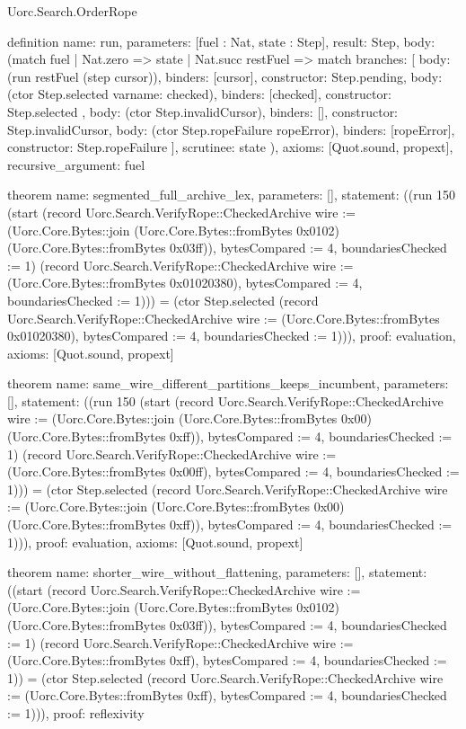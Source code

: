 \begin{lexlean}{Uorc.Search.OrderRope}
\begin{semanticmodule}
definition{
  name: run,
  parameters: [fuel : Nat, state : Step],
  result: Step,
  body: (match fuel
    | Nat.zero => state
    | Nat.succ restFuel => match{
      branches: [
        {body: (run restFuel (step cursor)), binders: [cursor], constructor: Step.pending},
        {
          body: (ctor Step.selected var{name: checked}),
          binders: [checked],
          constructor: Step.selected
        },
        {body: (ctor Step.invalidCursor), binders: [], constructor: Step.invalidCursor},
        {
          body: (ctor Step.ropeFailure ropeError),
          binders: [ropeError],
          constructor: Step.ropeFailure
        }
      ],
      scrutinee: state
    }),
  axioms: [Quot.sound, propext],
  recursive_argument: fuel
}

theorem{
  name: segmented_full_archive_lex,
  parameters: [],
  statement: ((run 150 (start (record Uorc.Search.VerifyRope::CheckedArchive {wire := (Uorc.Core.Bytes::join (Uorc.Core.Bytes::fromBytes 0x0102) (Uorc.Core.Bytes::fromBytes 0x03ff)), bytesCompared := 4, boundariesChecked := 1}) (record Uorc.Search.VerifyRope::CheckedArchive {wire := (Uorc.Core.Bytes::fromBytes 0x01020380), bytesCompared := 4, boundariesChecked := 1}))) = (ctor Step.selected (record Uorc.Search.VerifyRope::CheckedArchive {wire := (Uorc.Core.Bytes::fromBytes 0x01020380), bytesCompared := 4, boundariesChecked := 1}))),
  proof: evaluation{},
  axioms: [Quot.sound, propext]
}

theorem{
  name: same_wire_different_partitions_keeps_incumbent,
  parameters: [],
  statement: ((run 150 (start (record Uorc.Search.VerifyRope::CheckedArchive {wire := (Uorc.Core.Bytes::join (Uorc.Core.Bytes::fromBytes 0x00) (Uorc.Core.Bytes::fromBytes 0xff)), bytesCompared := 4, boundariesChecked := 1}) (record Uorc.Search.VerifyRope::CheckedArchive {wire := (Uorc.Core.Bytes::fromBytes 0x00ff), bytesCompared := 4, boundariesChecked := 1}))) = (ctor Step.selected (record Uorc.Search.VerifyRope::CheckedArchive {wire := (Uorc.Core.Bytes::join (Uorc.Core.Bytes::fromBytes 0x00) (Uorc.Core.Bytes::fromBytes 0xff)), bytesCompared := 4, boundariesChecked := 1}))),
  proof: evaluation{},
  axioms: [Quot.sound, propext]
}

theorem{
  name: shorter_wire_without_flattening,
  parameters: [],
  statement: ((start (record Uorc.Search.VerifyRope::CheckedArchive {wire := (Uorc.Core.Bytes::join (Uorc.Core.Bytes::fromBytes 0x0102) (Uorc.Core.Bytes::fromBytes 0x03ff)), bytesCompared := 4, boundariesChecked := 1}) (record Uorc.Search.VerifyRope::CheckedArchive {wire := (Uorc.Core.Bytes::fromBytes 0xff), bytesCompared := 4, boundariesChecked := 1})) = (ctor Step.selected (record Uorc.Search.VerifyRope::CheckedArchive {wire := (Uorc.Core.Bytes::fromBytes 0xff), bytesCompared := 4, boundariesChecked := 1}))),
  proof: reflexivity{}
}


\end{semanticmodule}
\end{lexlean}
